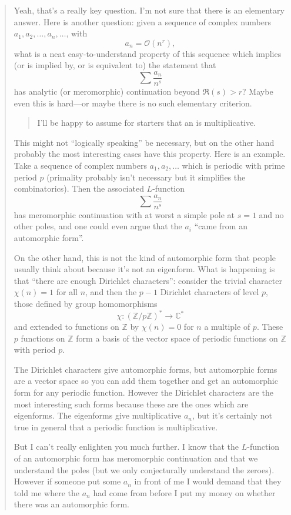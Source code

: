 \documentclass{article}
\begin{document}
\begin{quote}
Yeah, that's a really key question. I'm not sure that there is an
elementary answer. Here is another question: given a sequence of complex
numbers \(a_1, a_2,\ldots,a_n,\ldots\), with \[a_n = \mathcal{O}(n^r),\]
what is a neat easy-to-understand property of this sequence which
implies (or is implied by, or is equivalent to) the statement that
\[\sum \frac{a_n}{n^s}\] has analytic (or meromorphic) continuation
beyond \(\Re(s)>r\)? Maybe even this is hard---or maybe there is no such
elementary criterion.

\begin{quote}
I'll be happy to assume for starters that an is multiplicative.
\end{quote}

This might not ``logically speaking'' be necessary, but on the other
hand probably the most interesting cases have this property. Here is an
example. Take a sequence of complex numbers \(a_1, a_2, \ldots\) which
is periodic with prime period \(p\) (primality probably isn't necessary
but it simplifies the combinatorics). Then the associated \(L\)-function
\[\sum \frac{a_n}{n^s}\] has meromorphic continuation with at worst a
simple pole at \(s=1\) and no other poles, and one could even argue that
the \(a_i\) ``came from an automorphic form''.

On the other hand, this is not the kind of automorphic form that people
usually think about because it's not an eigenform. What is happening is
that ``there are enough Dirichlet characters'': consider the trivial
character \(\chi(n)=1\) for all \(n\), and then the \(p-1\) Dirichlet
characters of level \(p\), those defined by group homomorphisms
\[\chi\colon (\mathbb{Z}/p\mathbb{Z})^* \to \mathbb{C}^*\] and extended
to functions on \(\mathbb{Z}\) by \(\chi(n)=0\) for \(n\) a multiple of
\(p\). These \(p\) functions on \(\mathbb{Z}\) form a basis of the
vector space of periodic functions on \(\mathbb{Z}\) with period \(p\).

The Dirichlet characters give automorphic forms, but automorphic forms
are a vector space so you can add them together and get an automorphic
form for any periodic function. However the Dirichlet characters are the
most interesting such forms because these are the ones which are
eigenforms. The eigenforms give multiplicative \(a_n\), but it's
certainly not true in general that a periodic function is
multiplicative.

But I can't really enlighten you much further. I know that the
\(L\)-function of an automorphic form has meromorphic continuation and
that we understand the poles (but we only conjecturally understand the
zeroes). However if someone put some \(a_n\) in front of me I would
demand that they told me where the \(a_n\) had come from before I put my
money on whether there was an automorphic form.


\end{quote}
\end{document}
